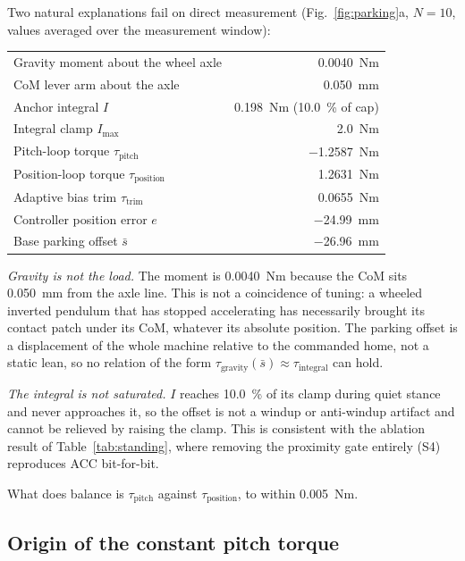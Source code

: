 \documentclass[conference]{IEEEtran}
\begin{document}
Two natural explanations fail on direct measurement (Fig.~\ref{fig:parking}a,
$N{=}10$, values averaged over the measurement window):

\begin{center}\footnotesize
\begin{tabular}{lr}
\hline
Gravity moment about the wheel axle & \SI{+0.0040}{Nm} \\
CoM lever arm about the axle & \SI{0.050}{mm} \\
Anchor integral $I$ & \SI{0.198}{Nm} (\SI{10.0}{\percent} of cap) \\
Integral clamp $I_{\max}$ & \SI{2.0}{Nm} \\
Pitch-loop torque $\tau_{\text{pitch}}$ & \SI{-1.2587}{Nm} \\
Position-loop torque $\tau_{\text{position}}$ & \SI{+1.2631}{Nm} \\
Adaptive bias trim $\tau_{\text{trim}}$ & \SI{+0.0655}{Nm} \\
Controller position error $e$ & \SI{-24.99}{mm} \\
Base parking offset $\bar{s}$ & \SI{-26.96}{mm} \\
\hline
\end{tabular}
\end{center}

\emph{Gravity is not the load.} The moment is \SI{0.0040}{Nm} because the CoM
sits \SI{0.050}{mm} from the axle line. This is not a coincidence of tuning: a
wheeled inverted pendulum that has stopped accelerating has necessarily brought
its contact patch under its CoM, whatever its absolute position. The parking
offset is a displacement of the whole machine relative to the commanded home,
not a static lean, so no relation of the form
$\tau_{\text{gravity}}(\bar{s})\approx\tau_{\text{integral}}$ can hold.

\emph{The integral is not saturated.} $I$ reaches \SI{10.0}{\percent} of its
clamp during quiet stance and never approaches it, so the offset is not a
windup or anti-windup artifact and cannot be relieved by raising the clamp.
This is consistent with the ablation result of Table~\ref{tab:standing}, where
removing the proximity gate entirely (S4) reproduces ACC bit-for-bit.

What does balance is $\tau_{\text{pitch}}$ against $\tau_{\text{position}}$,
to within \SI{0.005}{Nm}.

\subsection{Origin of the constant pitch torque}
\end{document}
